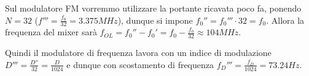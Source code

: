 Sul modulatore FM vorremmo utilizzare la portante ricavata poco fa, ponendo $N=32$ ($f''' = \frac{f_0}{32} = 3.375MHz$), dunque si impone $f_0''=f_0'''\cdot 32 = f_0$. Allora la frequenza del mixer sarà $f_{OL} = f_0''-f_0'=
f_0 - \frac{f_0}{32} \approx 104MHz$.

Quindi il modulatore di frequenza lavora con un indice di modulazione $D''' = \frac{D''}{32} = \frac{D}{1024}$ e dunque con scostamento di frequenza $f_D''' = \frac{f_D}{1024} = 73.24Hz$.

%
%


